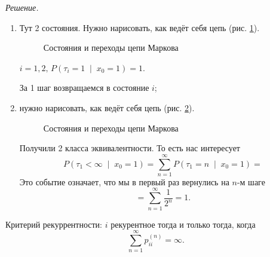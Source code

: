 \textit{Решение.}
\begin{enumerate}[label=\alph*)]
  \item Тут 2 состояния.
  Нужно нарисовать, как ведёт себя цепь (рис. \ref{fig:162}).

  \begin{figure}[h]
    \centering
    
    \caption{Состояния и переходы цепи Маркова}
    \label{fig:162}
  \end{figure}

  $i = 1, 2, \, P \left( \tau_i = 1 \; \middle| \; x_0 = 1 \right) = 1$.

  За 1 шаг возвращаемся в состояние $i$;
  \item нужно нарисовать, как ведёт себя цепь (рис. \ref{fig:1621}).

  \begin{figure}[h]
    \centering
    
    \caption{Состояния и переходы цепи Маркова}
    \label{fig:1621}
  \end{figure}

  Получили 2 класса эквивалентности.
  То есть нас интересует
  \begin{equation*}
    P \left( \tau_1 < \infty \; \middle| \; x_0 = 1 \right) =
    \sum \limits_{n = 1}^{ \infty }
      P \left( \tau_1 = n \; \middle| \; x_0 = 1 \right) =
  \end{equation*}
  Это событие означает, что мы в первый раз вернулись на $n$-м шаге
  \begin{equation*}
    = \sum \limits_{n = 1}^{ \infty } \frac{1}{2^n} =
    1.
  \end{equation*}
\end{enumerate}

Критерий рекуррентности: $i$ рекурентное тогда и только тогда, когда
\begin{equation*}
  \sum \limits_{n = 1}^{ \infty } p_{ii}^{ \left( n \right) } =
  \infty.
\end{equation*}
